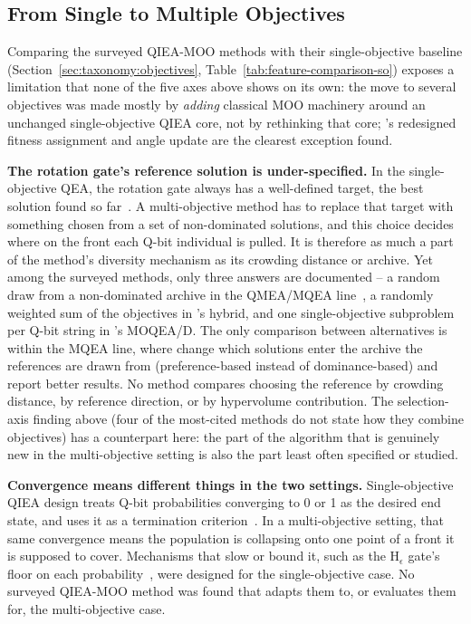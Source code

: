 \subsection{From Single to Multiple Objectives}
\label{sec:critical-analysis:so-to-mo}

Comparing the surveyed QIEA-MOO methods with their single-objective
baseline (Section~\ref{sec:taxonomy:objectives},
Table~\ref{tab:feature-comparison-so}) exposes a limitation that none of
the five axes above shows on its own: the move to several objectives was
made mostly by \emph{adding} classical MOO machinery around an unchanged
single-objective QIEA core, not by rethinking that core;
\citet{ho2013vectorqea}'s redesigned fitness assignment and angle update
are the clearest exception found.

\textbf{The rotation gate's reference solution is under-specified.} In
the single-objective QEA, the rotation gate always has a well-defined
target, the best solution found so far~\citep{han2002qea}. A
multi-objective method has to replace that target with something chosen
from a set of non-dominated solutions, and this choice decides where on
the front each Q-bit individual is pulled. It is therefore as much a
part of the method's diversity mechanism as its crowding distance or
archive. Yet among the surveyed methods, only three answers are
documented -- a random draw from a non-dominated archive in the
QMEA/MQEA line~\citep{kim2009mqea,ryu2014dmqea}, a randomly weighted sum
of the objectives in \citet{li2007hqga}'s hybrid, and one
single-objective subproblem per Q-bit string in
\citet{deng2024moqead}'s MOQEA/D. The only comparison between
alternatives is within the MQEA line, where \citet{kim2011mqeaps}
change which solutions enter the archive the references are drawn from
(preference-based instead of dominance-based) and report better results.
No method compares choosing the reference by crowding distance, by
reference direction, or by hypervolume contribution. The
selection-axis finding above (four of the most-cited methods do not
state how they combine objectives) has a counterpart here: the part of
the algorithm that is genuinely new in the multi-objective setting is
also the part least often specified or studied.

\textbf{Convergence means different things in the two settings.}
Single-objective QIEA design treats Q-bit probabilities converging to 0
or 1 as the desired end state, and uses it as a termination
criterion~\citep{han2004hepsilon}. In a multi-objective setting, that
same convergence means the population is collapsing onto one point of a
front it is supposed to cover. Mechanisms that slow or bound it, such as
the H$_\epsilon$ gate's floor on each probability~\citep{han2004hepsilon},
were designed for the single-objective case. No surveyed
QIEA-MOO method was found that adapts them to, or evaluates them for, the
multi-objective case.

